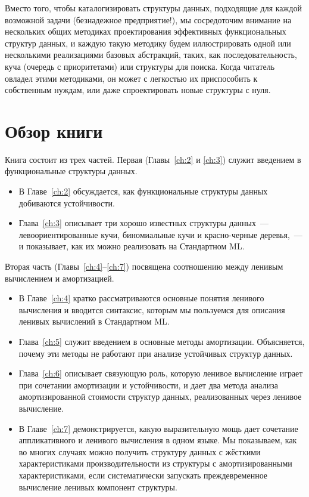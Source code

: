 Вместо того, чтобы каталогизировать структуры данных, подходящие для каждой
возможной задачи (безнадежное предприятие!), мы сосредоточим внимание на нескольких
общих методиках проектирования эффективных функциональных структур
данных, и каждую такую методику будем иллюстрировать одной или
несколькими реализациями базовых абстракций, таких, как
последовательность, куча (очередь с приоритетами) или структуры для
поиска.  Когда читатель овладел этими методиками, он может с
легкостью их приспособить к собственным нуждам, или даже
спроектировать новые структуры с нуля.

\section{Обзор книги}

Книга состоит из трех частей. Первая (Главы~\ref{ch:2} и \ref{ch:3})
служит введением в функциональные структуры данных.
\begin{itemize}
\item В Главе~\ref{ch:2} обсуждается, как функциональные структуры
  данных добиваются устойчивости.
\item Глава~\ref{ch:3} описывает три хорошо известных структуры
  данных~--- левоориентированные кучи,
  биномиальные кучи и красно-черные деревья,~--- и показывает, как их
  можно реализовать на Стандартном ML.
\end{itemize}
Вторая часть (Главы~\ref{ch:4}--\ref{ch:7}) посвящена соотношению
между ленивым вычислением и амортизацией.
\begin{itemize}
\item В Главе~\ref{ch:4} кратко рассматриваются основные понятия
  ленивого вычисления и вводится синтаксис, которым мы пользуемся для
  описания ленивых вычислений в Стандартном ML.
\item Глава~\ref{ch:5} служит введением в основные методы
  амортизации. Объясняется, почему эти методы не работают при
  анализе устойчивых структур данных.
\item Глава~\ref{ch:6} описывает связующую роль, которую ленивое
  вычисление играет при сочетании амортизации и устойчивости, и дает
  два метода анализа амортизированной стоимости структур данных,
  реализованных через ленивое вычисление.
\item В Главе~\ref{ch:7} демонстрируется, какую выразительную мощь дает
  сочетание аппликативного и ленивого вычисления в одном языке.
  Мы показываем, как во многих случаях можно получить структуру данных
  с жёсткими характеристиками производительности из структуры с
  амортизированными характеристиками, если систематически запускать
  преждевременное вычисление ленивых компонент структуры.
\end{itemize}
